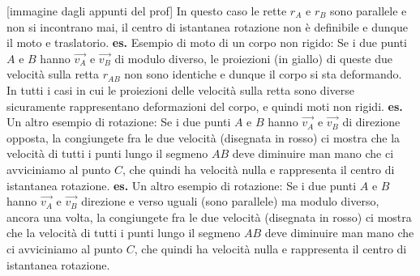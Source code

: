 [immagine dagli appunti del prof]\newline
In questo caso le rette $r_A$ e $r_B$ sono parallele e non si incontrano mai, il centro di istantanea rotazione non è definibile e dunque il moto e traslatorio.\newline
\newline
\textbf{es.} Esempio di moto di un corpo non rigido:\newline
Se i due punti $A$ e $B$ hanno $\vec{v_A}$ e $\vec{v_B}$ di modulo diverso, le proiezioni (in giallo) di queste due velocità sulla retta $r_{AB}$ non sono identiche e dunque il corpo si sta deformando. In tutti i casi in cui le proiezioni delle velocità sulla retta sono diverse sicuramente rappresentano deformazioni del corpo, e quindi moti non rigidi.\newline
\newline
\textbf{es.} Un altro esempio di rotazione:\newline
Se i due punti $A$ e $B$ hanno $\vec{v_A}$ e $\vec{v_B}$ di direzione opposta, la congiungete fra le due velocità (disegnata in rosso) ci mostra che la velocità di tutti i punti lungo il segmeno $AB$ deve diminuire man mano che ci avviciniamo al punto $C$, che quindi ha velocità nulla e rappresenta il centro di istantanea rotazione.\newline
\newline
\textbf{es.} Un altro esempio di rotazione:\newline
Se i due punti $A$ e $B$ hanno $\vec{v_A}$ e $\vec{v_B}$ direzione e verso uguali (sono parallele) ma modulo diverso, ancora una volta, la congiungete fra le due velocità (disegnata in rosso) ci mostra che la velocità di tutti i punti lungo il segmeno $AB$ deve diminuire man mano che ci avviciniamo al punto $C$, che quindi ha velocità nulla e rappresenta il centro di istantanea rotazione.

